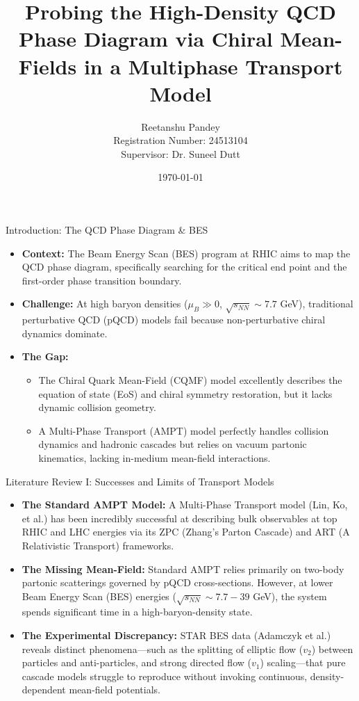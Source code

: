 \documentclass[aspectratio=169]{beamer}
\title[PhD Objectives: AMPT \& CQMF]{Probing the High-Density QCD Phase Diagram via Chiral Mean-Fields in a Multiphase Transport Model}
\author[Reetanshu Pandey]{Reetanshu Pandey \\ \vspace{0.2cm} \small Registration Number: 24513104 \\ \vspace{0.2cm} \small Supervisor: Dr. Suneel Dutt}
\institute[NIT Jalandhar]{Dr. B. R. Ambedkar National Institute of Technology \\ Jalandhar, Punjab, 144008}
\date{\today}
\begin{document}
\begin{frame}
    \titlepage
\end{frame}

\begin{frame}{Introduction: The QCD Phase Diagram \& BES}
    \begin{itemize}
        \item \textbf{Context:} The Beam Energy Scan (BES) program at RHIC aims to map the QCD phase diagram, specifically searching for the critical end point and the first-order phase transition boundary.
        \item \textbf{Challenge:} At high baryon densities ($\mu_B \gg 0$, $\sqrt{s_{NN}} \sim 7.7$ GeV), traditional perturbative QCD (pQCD) models fail because non-perturbative chiral dynamics dominate.
        \item \textbf{The Gap:} 
        \begin{itemize}
            \item The Chiral Quark Mean-Field (CQMF) model excellently describes the equation of state (EoS) and chiral symmetry restoration, but it lacks dynamic collision geometry.
            \item A Multi-Phase Transport (AMPT) model perfectly handles collision dynamics and hadronic cascades but relies on vacuum partonic kinematics, lacking in-medium mean-field interactions.
        \end{itemize}
    \end{itemize}
\end{frame}

\begin{frame}{Literature Review I: Successes and Limits of Transport Models}
    \begin{itemize}
        \item \textbf{The Standard AMPT Model:} A Multi-Phase Transport model (Lin, Ko, et al.) has been incredibly successful at describing bulk observables at top RHIC and LHC energies via its ZPC (Zhang's Parton Cascade) and ART (A Relativistic Transport) frameworks.
        \item \textbf{The Missing Mean-Field:} Standard AMPT relies primarily on two-body partonic scatterings governed by pQCD cross-sections. However, at lower Beam Energy Scan (BES) energies ($\sqrt{s_{NN}} \sim 7.7 - 39$ GeV), the system spends significant time in a high-baryon-density state.
        \item \textbf{The Experimental Discrepancy:} STAR BES data (Adamczyk et al.) reveals distinct phenomena—such as the splitting of elliptic flow ($v_2$) between particles and anti-particles, and strong directed flow ($v_1$) scaling—that pure cascade models struggle to reproduce without invoking continuous, density-dependent mean-field potentials.
    \end{itemize}
\end{frame}
\end{document}
